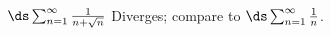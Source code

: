 {$\ds \sum_{n=1}^\infty \frac{1}{n+\sqrt{n}}$
}
{Diverges; compare to $\ds \sum_{n=1}^\infty \frac {1}{n}$.
}